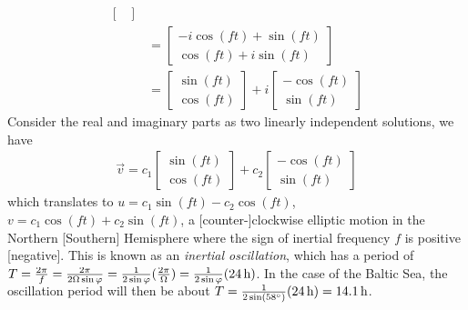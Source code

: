 \begin{solution}
\begin{align*}
\begin{bmatrix}
\end{bmatrix} \\
&= \begin{bmatrix}
-i \cos(ft) + \sin(ft) \\
\cos(ft) + i \sin(ft)
\end{bmatrix} \\
&= 
\begin{bmatrix}
\sin(ft) \\
\cos(ft) 
\end{bmatrix}
+i 
\begin{bmatrix}
-\cos(ft) \\
\sin(ft) 
\end{bmatrix}
\end{align*}
Consider the real and imaginary parts as two linearly independent solutions, we have \begin{align*}
\vec{v} = c_1\begin{bmatrix}
\sin(ft) \\
\cos(ft) 
\end{bmatrix} + c_2\begin{bmatrix}
-\cos(ft) \\
\sin(ft) 
\end{bmatrix}    
\end{align*}
which translates to $u = c_1\sin(ft) - c_2\cos(ft)$, $v = c_1\cos(ft) + c_2\sin(ft)$, a [counter-]clockwise elliptic motion in the Northern [Southern] Hemisphere where the sign of inertial frequency $f$ is positive [negative]. This is known as an \textit{inertial oscillation}, which has a period of $T = \smash{\frac{2\pi}{f}} = \smash{\frac{2\pi}{2\Omega \sin \varphi}} = \smash{\frac{1}{2 \sin \varphi}(\frac{2\pi}{\Omega})} = \smash{\frac{1}{2 \sin \varphi}}(\SI{24}{\hour})$. In the case of the Baltic Sea, the oscillation period will then be about $T = \smash{\frac{1}{2 \sin(\SI{58}{\degree})}}(\SI{24}{\hour}) = \SI{14.1}{\hour}$.
\end{solution}

